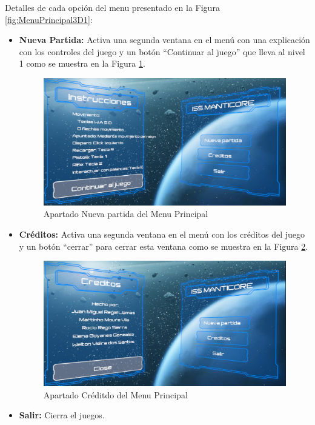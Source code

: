 Detalles de cada opción del menu presentado en la Figura \ref{fig:MenuPrincipal3D1}:
\begin{itemize}
	\item \textbf{Nueva Partida:} Activa una segunda ventana en el menú con una explicación con los controles del juego y un botón ``Continuar al juego'' que lleva al nivel 1 como se muestra en la Figura \ref{fig:MenuPrincipalNuevaPartida}.
	\begin{figure}[H]
		\centering
		\includegraphics[scale=0.35]{imagenes/MenuPrincipalNuevaPartida.png}
		\caption{\label{fig:MenuPrincipalNuevaPartida}Apartado Nueva partida del Menu Principal}
	\end{figure}
	\item \textbf{Créditos:} Activa una segunda ventana en el menú con los créditos del juego y un botón ``cerrar'' para cerrar esta ventana como se muestra en la Figura \ref{fig:MenuPrincipalCreditos}.
	\begin{figure}[H]
		\centering
		\includegraphics[scale=0.35]{imagenes/MenuPrincipalCreditos.png}
		\caption{\label{fig:MenuPrincipalCreditos}Apartado Créditdo del Menu Principal}
	\end{figure}
	\item \textbf{Salir:} Cierra el juegos.
\end{itemize}


